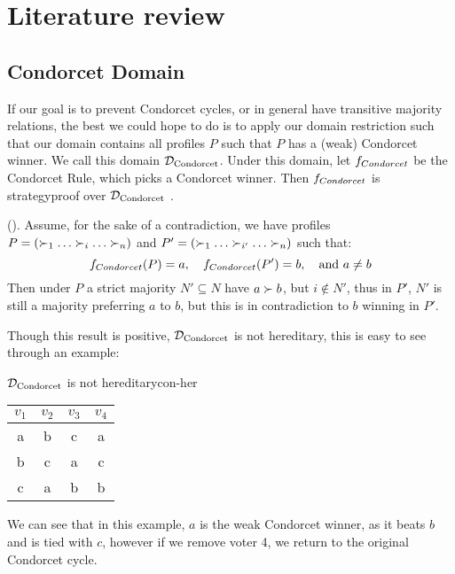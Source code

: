 \newpage
\chapter{Literature review}
\label{Literature}






\section{Condorcet Domain}
If our goal is to prevent Condorcet cycles, or in general have transitive majority relations, the best we could hope to do is to apply our domain restriction such that our domain contains all profiles $P$ such that $P$ has a (weak) Condorcet winner. We call this domain $\mathcal{D}_{\textnormal{Condorcet}}$. Under this domain, let $f_{\normalfont{Condorcet}}$ be the Condorcet Rule, which picks a Condorcet winner. Then $f_{\normalfont{Condorcet}}$ is strategyproof over $\mathcal{D}_{\textnormal{Condorcet}}$ \citep{elkindPreferenceRestrictionsComputational2022a}.

\begin{proofc}{(\citet{elkindPreferenceRestrictionsComputational2022a})}.
	Assume, for the sake of a contradiction, we have profiles $P = (\pref_1 \dots \pref_i \dots \pref_n)$ and $P' = (\pref_1 \dots \pref_{i'} \dots \pref_n)$ such that:
	\[
		f_{\normalfont{Condorcet}}(P) = a, \quad f_{\normalfont{Condorcet}}(P') = b, \quad \text{and } a \neq b
	\]
	Then under $P$ a strict majority $N' \subseteq N$ have $a \succ b$, but $i \notin N'$, thus in $P'$, $N'$ is still a majority preferring $a$ to $b$, but this is in contradiction to $b$ winning in $P'$.
\end{proofc}


Though this result is positive, $\mathcal{D}_{\textnormal{Condorcet}}$ is not hereditary, this is easy to see through an example:
\begin{example}{$\mathcal{D}_{\textnormal{Condorcet}}$ is not hereditary}{con-her}
	\begin{minipage}{0.25\linewidth}
		\begin{tabular}{cccc}
			\toprule
			$v_1$ & $v_2$ & $v_3$ & $v_4$ \\
			\midrule
			a     & b     & c     & a     \\
			b     & c     & a     & c     \\
			c     & a     & b     & b     \\
			\bottomrule
		\end{tabular}
	\end{minipage}
	\begin{minipage}[b]{0.70\linewidth}
		We can see that in this example, $a$ is the weak Condorcet winner, as it beats $b$ and is tied with $c$, however if we remove voter 4, we return to the original Condorcet cycle.
	\end{minipage}
\end{example}

